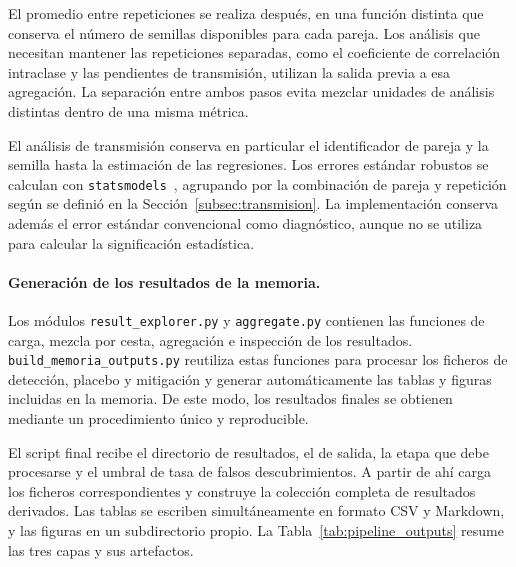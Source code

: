El promedio entre repeticiones se realiza después, en una función distinta que conserva el número de semillas disponibles para cada pareja. Los análisis que necesitan mantener las repeticiones separadas, como el coeficiente de correlación intraclase y las pendientes de transmisión, utilizan la salida previa a esa agregación. La separación entre ambos pasos evita mezclar unidades de análisis distintas dentro de una misma métrica.

El análisis de transmisión conserva en particular el identificador de pareja y la semilla hasta la estimación de las regresiones. Los errores estándar robustos se calculan con \texttt{statsmodels}~\cite{seabold2010statsmodels}, agrupando por la combinación de pareja y repetición según se definió en la Sección~\ref{subsec:transmision}. La implementación conserva además el error estándar convencional como diagnóstico, aunque no se utiliza para calcular la significación estadística.

\paragraph{Generación de los resultados de la memoria.}

Los módulos \texttt{result\_explorer.py} y \texttt{aggregate.py} contienen las funciones de carga, mezcla por cesta, agregación e inspección de los resultados. \texttt{build\_memoria\_outputs.py} reutiliza estas funciones para procesar los ficheros de detección, placebo y mitigación y generar automáticamente las tablas y figuras incluidas en la memoria. De este modo, los resultados finales se obtienen mediante un procedimiento único y reproducible.

El script final recibe el directorio de resultados, el de salida, la etapa que debe procesarse y el umbral de tasa de falsos descubrimientos. A partir de ahí carga los ficheros correspondientes y construye la colección completa de resultados derivados. Las tablas se escriben simultáneamente en formato CSV y Markdown, y las figuras en un subdirectorio propio. La Tabla~\ref{tab:pipeline_outputs} resume las tres capas y sus artefactos.

